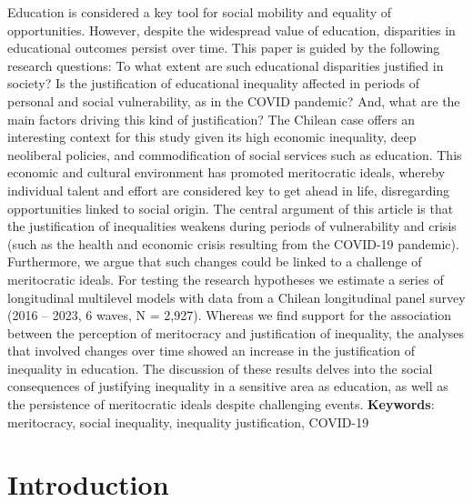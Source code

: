 \documentclass[
  12pt,
  10pt]{article}
\begin{document}
Education is considered a key tool for social mobility and equality of
opportunities. However, despite the widespread value of education,
disparities in educational outcomes persist over time. This paper is
guided by the following research questions: To what extent are such
educational disparities justified in society? Is the justification of
educational inequality affected in periods of personal and social
vulnerability, as in the COVID pandemic? And, what are the main factors
driving this kind of justification? The Chilean case offers an
interesting context for this study given its high economic inequality,
deep neoliberal policies, and commodification of social services such as
education. This economic and cultural environment has promoted
meritocratic ideals, whereby individual talent and effort are considered
key to get ahead in life, disregarding opportunities linked to social
origin. The central argument of this article is that the justification
of inequalities weakens during periods of vulnerability and crisis (such
as the health and economic crisis resulting from the COVID-19 pandemic).
Furthermore, we argue that such changes could be linked to a challenge
of meritocratic ideals. For testing the research hypotheses we estimate
a series of longitudinal multilevel models with data from a Chilean
longitudinal panel survey (2016 -- 2023, 6 waves, N = 2,927). Whereas we
find support for the association between the perception of meritocracy
and justification of inequality, the analyses that involved changes over
time showed an increase in the justification of inequality in education.
The discussion of these results delves into the social consequences of
justifying inequality in a sensitive area as education, as well as the
persistence of meritocratic ideals despite challenging events.\newline
\textbf{Keywords}: meritocracy, social inequality, inequality
justification, COVID-19

\section{Introduction}\label{introduction}
\end{document}
